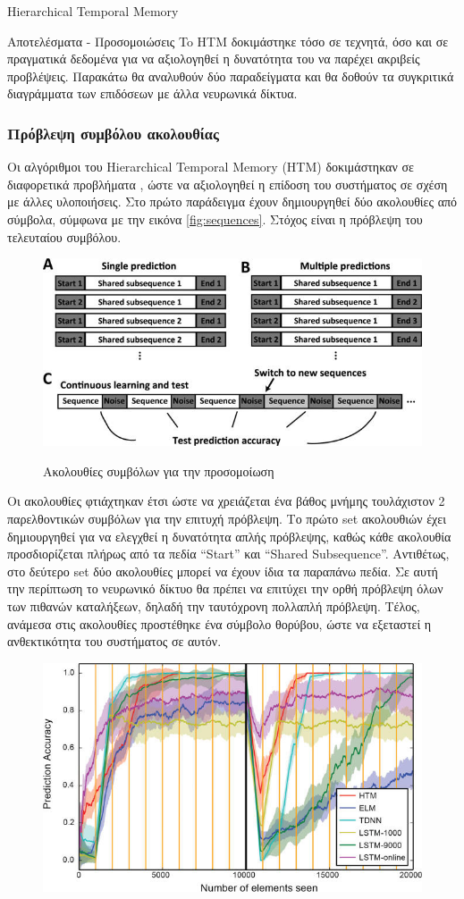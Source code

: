 \documentclass[a4paper,11pt]{article}
\begin{document}
\begin{section}{Hierarchical Temporal Memory}
  \begin{subsection}{Αποτελέσματα - Προσομοιώσεις}
    To ΗΤΜ δοκιμάστηκε τόσο σε τεχνητά, όσο και σε πραγματικά δεδομένα για να αξιολογηθεί η δυνατότητα του να παρέχει ακριβείς προβλέψεις. Παρακάτω θα αναλυθούν δύο παραδείγματα και θα δοθούν τα συγκριτικά διαγράμματα των επιδόσεων με άλλα νευρωνικά δίκτυα.
    \subsubsection{Πρόβλεψη συμβόλου ακολουθίας}
    Οι αλγόριθμοι του Hierarchical Temporal Memory (HTM) δοκιμάστηκαν σε διαφορετικά προβλήματα \cite{continuous,nab}, ώστε να αξιολογηθεί η επίδοση του συστήματος σε σχέση με άλλες υλοποιήσεις. Στο πρώτο παράδειγμα έχουν δημιουργηθεί δύο ακολουθίες από σύμβολα, σύμφωνα με την εικόνα \eqref{fig:sequences}. Στόχος είναι η πρόβλεψη του τελευταίου συμβόλου.
    \begin{figure}[H]
      \centering%
      {\includegraphics[width=0.8\columnwidth,clip=true]{pics/sequences.jpg}}
      \caption{Ακολουθίες συμβόλων για την προσομοίωση} \label{fig:sequences}
    \end{figure}
    Οι ακολουθίες φτιάχτηκαν έτσι ώστε να χρειάζεται ένα βάθος μνήμης τουλάχιστον 2 παρελθοντικών συμβόλων για την επιτυχή πρόβλεψη. Το πρώτο set ακολουθιών έχει δημιουργηθεί για να ελεγχθεί η δυνατότητα απλής πρόβλεψης, καθώς κάθε ακολουθία προσδιορίζεται πλήρως από τα πεδία ``Start'' και ``Shared Subsequence''. Αντιθέτως, στο δεύτερο set δύο ακολουθίες μπορεί να έχουν ίδια τα παραπάνω πεδία. Σε αυτή την περίπτωση το νευρωνικό δίκτυο θα πρέπει να επιτύχει την ορθή πρόβλεψη όλων των πιθανών καταλήξεων, δηλαδή την ταυτόχρονη πολλαπλή πρόβλεψη. Τέλος, ανάμεσα στις ακολουθίες προστέθηκε ένα σύμβολο θορύβου, ώστε να εξεταστεί η ανθεκτικότητα του συστήματος σε αυτόν.
    \begin{figure}[H]
      \centering%
      {\includegraphics[width=0.7\columnwidth,clip=true]{pics/single_prediction.jpg}}

\end{figure}
\end{subsection}
\end{section}
\end{document}
